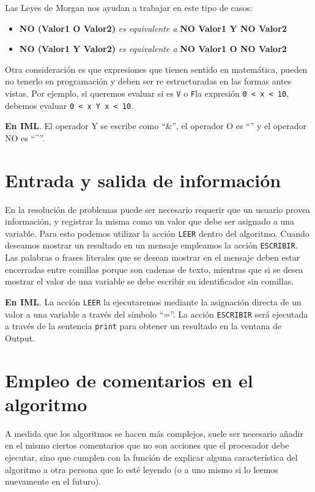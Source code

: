 \documentclass[]{book}
\providecommand{\tightlist}{%
  \setlength{\itemsep}{0pt}\setlength{\parskip}{0pt}}
\begin{document}
Las Leyes de Morgan nos ayudan a trabajar en este tipo de casos:

\begin{itemize}
\tightlist
\item
  \textbf{NO (Valor1 O Valor2)} \emph{es equivalente a} \textbf{NO
  Valor1 Y NO Valor2}
\item
  \textbf{NO (Valor1 Y Valor2)} \emph{es equivalente a} \textbf{NO
  Valor1 O NO Valor2}
\end{itemize}

Otra consideración es que expresiones que tienen sentido en matemática,
pueden no tenerlo en programación y deben ser re estructuradas en las
formas antes vistas. Por ejemplo, si queremos evaluar si es \texttt{V} o
\texttt{F}la expresión \texttt{0\ \textless{}\ x\ \textless{}\ 10},
debemos evaluar \texttt{0\ \textless{}\ x\ Y\ x\ \textless{}\ 10}.

\textbf{En IML}. El operador Y se escribe como ``\&'', el operador O es
``\textbar{}'' y el operador NO es ``\^{}''.

\section{Entrada y salida de
información}\label{entrada-y-salida-de-informacion}

En la resolución de problemas puede ser necesario requerir que un
usuario provea información, y registrar la misma como un valor que debe
ser asignado a una variable. Para esto podemos utilizar la acción
\texttt{LEER} dentro del algoritmo. Cuando deseamos mostrar un resultado
en un mensaje empleamos la acción \texttt{ESCRIBIR}. Las palabras o
frases literales que se desean mostrar en el mensaje deben estar
encerradas entre comillas porque son cadenas de texto, mientras que si
se desea mostrar el valor de una variable se debe escribir su
identificador sin comillas.

\textbf{En IML}. La acción \texttt{LEER} la ejecutaremos mediante la
asignación directa de un valor a una variable a través del símbolo
``=''. La acción \texttt{ESCRIBIR} será ejecutada a través de la
sentencia \texttt{print} para obtener un resultado en la ventana de
Output.

\section{Empleo de comentarios en el
algoritmo}\label{empleo-de-comentarios-en-el-algoritmo}

A medida que los algoritmos se hacen más complejos, suele ser necesario
añadir en el mismo ciertos comentarios que no son acciones que el
procesador debe ejecutar, sino que cumplen con la función de explicar
alguna característica del algoritmo a otra persona que lo esté leyendo
(o a uno mismo si lo leemos nuevamente en el futuro).
\end{document}
